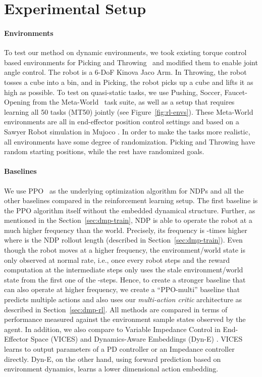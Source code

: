 \documentclass{article}
\newcommand{\our}{NDP\xspace}
\newcommand{\ours}{NDPs\xspace}
\begin{document}
\section{Experimental Setup}
\label{sec:baseline}

\paragraph{Environments}
\label{sec:envs}
To test our method on dynamic environments, we took existing torque control based environments for Picking and Throwing~\cite{ghosh2017divide} and modified them to enable joint angle control. The robot is a 6-DoF Kinova Jaco Arm. In Throwing, the robot tosses a cube into a bin, and in Picking, the robot picks up a cube and lifts it as high as possible. To test on quasi-static tasks, we use Pushing, Soccer, Faucet-Opening from the Meta-World~\cite{yu2019meta} task suite, as well as a setup that requires learning all 50 tasks (MT50) jointly (see Figure~\ref{fig:rl-envs}). These Meta-World environments are all in end-effector position control settings and based on a Sawyer Robot simulation in Mujoco \cite{todorov12mujoco}. In order to make the tasks more realistic, all environments have some degree of randomization. Picking and Throwing have random starting positions, while the rest have randomized goals.

\paragraph{Baselines}
We use PPO~\cite{ppo} as the underlying optimization algorithm for \ours and all the other baselines compared in the reinforcement learning setup. The first baseline is the PPO algorithm itself without the embedded dynamical structure. Further, as mentioned in the Section~\ref{sec:dmp-train}, \our is able to operate the robot at a much higher frequency than the world. Precisely, its frequency is -times higher where  is the \our rollout length (described in Section~\ref{sec:dmp-train}). Even though the robot moves at a higher frequency, the environment/world state is only observed at normal rate, i.e., once every  robot steps and the reward computation at the intermediate  steps only uses the stale environment/world state from the first one of the -steps. Hence, to create a stronger baseline that can also operate at higher frequency, we create a ``PPO-multi'' baseline that predicts multiple actions and also uses our \textit{multi-action critic} architecture as described in Section~\ref{sec:dmp-rl}. All methods are compared in terms of performance measured against the environment sample states observed by the agent. In addition, we also compare to Variable Impedance Control in End-Effector Space (VICES) \cite{vices2019martin} and Dynamics-Aware Embeddings (Dyn-E) \cite{whitney2019dynamics} . VICES learns to output parameters of a PD controller or an Impedance controller directly. Dyn-E, on the other hand, using forward prediction based on environment dynamics, learns a lower dimensional action embedding.
\end{document}
